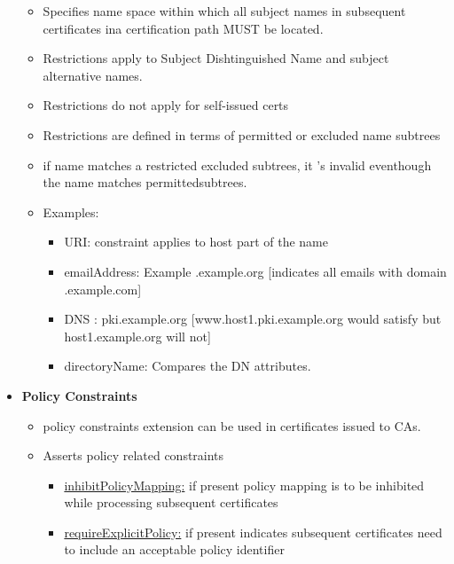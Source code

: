 \documentclass[12pt]{report}
\begin{document}
\begin{itemize}
\begin{itemize}
                    \item Specifies name space within which all subject names in 
                        subsequent certificates ina certification path MUST be located.
                    \item Restrictions apply to Subject Dishtinguished Name and 
                        subject alternative names.
                    \item Restrictions do not apply for self-issued certs
                    \item Restrictions are defined in terms of permitted or excluded name subtrees
                    \item if name matches a restricted excluded subtrees, it 's invalid eventhough the name matches permittedsubtrees.
                    \item Examples:
                    \begin{itemize}
                        \item URI:  constraint applies to host part of the name
                        \item emailAddress: Example .example.org [indicates all emails with domain .example.com]
                        \item DNS : pki.example.org [www.host1.pki.example.org would satisfy but host1.example.org will not]
                        \item directoryName: Compares the DN attributes. 
                    \end{itemize}
                \end{itemize}
            \item \textbf{Policy Constraints}
                \begin{itemize}
                    \item policy constraints extension can be used in certificates issued to CAs.
                    \item Asserts policy related constraints
                        \begin{itemize}
                            \item \underline{inhibitPolicyMapping:} if present policy mapping is to be inhibited while processing subsequent certificates
                            \item \underline{requireExplicitPolicy:} if present indicates subsequent certificates need to include an acceptable policy identifier
                        \end{itemize}

\end{itemize}
\end{itemize}
\end{document}
